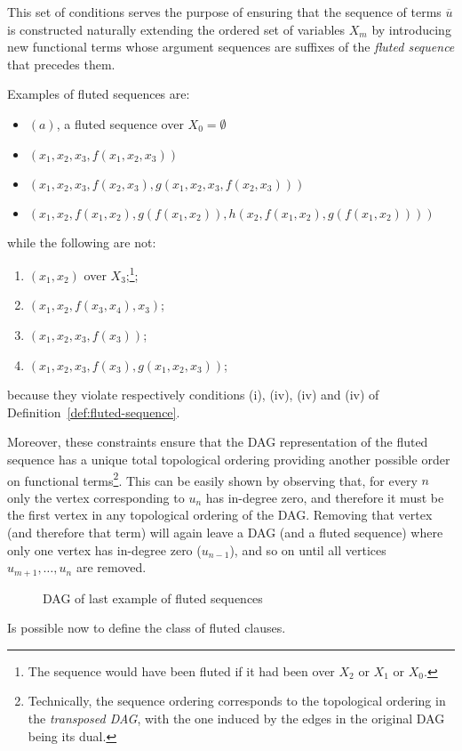 This set of conditions serves the purpose of ensuring that the sequence of terms \(\overline{u}\) is constructed naturally extending the ordered set of variables \(X_m\) by introducing new functional terms whose argument sequences are suffixes of the \emph{fluted sequence} that precedes them.

Examples of fluted sequences are:
\begin{itemize}
  \item \((a)\), a fluted sequence over \(X_0=\emptyset\)
  \item \((x_1,x_2,x_3,f(x_1,x_2,x_3))\)
  \item \((x_1,x_2,x_3,f(x_2,x_3),g(x_1,x_2,x_3,f(x_2,x_3)))\)
  \item \((x_1,x_2,f(x_1,x_2),g(f(x_1,x_2)),h(x_2,f(x_1,x_2),g(f(x_1,x_2))))\)
\end{itemize}
while the following are not:
\begin{enumerate}[label= (\roman*)]
  \item \((x_1,x_2)\) over \(X_3\);\footnote{The sequence would have been fluted if it had been over \(X_2\) or \(X_1\) or \(X_0\).};
  \item \((x_1,x_2,f(x_3,x_4),x_3)\);
  \item \((x_1,x_2,x_3,f(x_3))\);
  \item \((x_1,x_2,x_3,f(x_3),g(x_1,x_2,x_3))\);
\end{enumerate}
because they violate respectively conditions (i), (iv), (iv) and (iv) of Definition~\ref{def:fluted-sequence}.

Moreover, these constraints ensure that the DAG representation of the fluted sequence has a unique total topological ordering providing another possible order on functional terms\footnote{Technically, the sequence ordering corresponds to the topological ordering in the \emph{transposed DAG}, with the one induced by the edges in the original DAG being its dual.}.
This can be easily shown by observing that, for every \(n\) only the vertex corresponding to \(u_n\) has in-degree zero, and therefore it must be the first vertex in any topological ordering of the DAG\@. Removing that vertex (and therefore that term) will again leave a DAG (and a fluted sequence) where only one vertex has in-degree zero (\(u_{n-1}\)), and so on until all vertices \(u_{m+1},\ldots, u_n\) are removed.

\begin{figure}[H]
\centering
{}
\caption{DAG of last example of fluted sequences}\label{fig:fluted-sequence-dag}
\end{figure}
Is possible now to define the class of fluted clauses.

